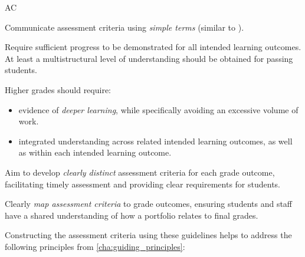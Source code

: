 \begin{guidelines}{AC}
  \item \label{ac-simple-terms} Communicate assessment criteria using \emph{simple terms} (similar to ).
  \item \label{ac-all-ilos} Require sufficient progress to be demonstrated for all intended learning outcomes. At least a multistructural level of understanding should be obtained for passing students.
  \item \label{ac-grades} Higher grades should require:
  \begin{itemize}[noitemsep,nolistsep]
  	\item evidence of \emph{deeper learning}, while specifically avoiding an excessive volume of work.
  	\item integrated understanding across related intended learning outcomes, as well as within each intended learning outcome.
  \end{itemize}
  \item \label{ac-distinct} Aim to develop \emph{clearly distinct} assessment criteria for each grade outcome, facilitating timely assessment and providing clear requirements for students.  
  \item \label{ac-map} Clearly \emph{map assessment criteria} to grade outcomes, ensuring students and staff have a shared understanding of how a portfolio relates to final grades.
\end{guidelines}

Constructing the assessment criteria using these guidelines helps to address the following principles from \cref{cha:guiding_principles}:

